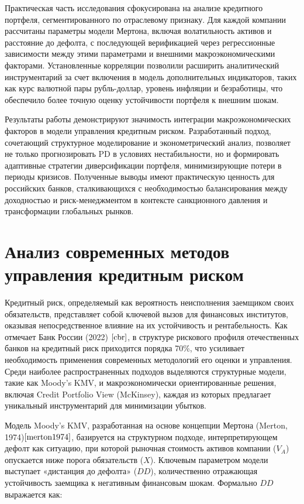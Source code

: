 \documentclass[]{article}
\begin{document}
	Практическая часть исследования сфокусирована на анализе кредитного портфеля, сегментированного по отраслевому признаку. Для каждой компании рассчитаны параметры модели Мертона, включая волатильность активов и расстояние до дефолта, с последующей верификацией через регрессионные зависимости между этими параметрами и внешними макроэкономическими факторами. Установленные корреляции позволили расширить аналитический инструментарий за счет включения в модель дополнительных индикаторов, таких как курс валютной пары рубль-доллар, уровень инфляции и безработицы, что обеспечило более точную оценку устойчивости портфеля к внешним шокам.  
	
	Результаты работы демонстрируют значимость интеграции макроэкономических факторов в модели управления кредитным риском. Разработанный подход, сочетающий структурное моделирование и эконометрический анализ, позволяет не только прогнозировать PD в условиях нестабильности, но и формировать адаптивные стратегии диверсификации портфеля, минимизирующие потери в периоды кризисов. Полученные выводы имеют практическую ценность для российских банков, сталкивающихся с необходимостью балансирования между доходностью и риск-менеджментом в контексте санкционного давления и трансформации глобальных рынков.
	
	
	
	\section{Анализ современных методов управления кредитным риском}
	
	Кредитный риск, определяемый как вероятность неисполнения заемщиком своих обязательств, представляет собой ключевой вызов для финансовых институтов, оказывая непосредственное влияние на их устойчивость и рентабельность. Как отмечает Банк России (2022) $\cite{cbr}$, в структуре рискового профиля отечественных банков на кредитный риск приходится порядка 70\%, что усиливает необходимость применения современных методологий его оценки и управления. Среди наиболее распространенных подходов выделяются структурные модели, такие как Moody’s KMV, и макроэкономически ориентированные решения, включая Credit Portfolio View (McKinsey), каждая из которых предлагает уникальный инструментарий для минимизации убытков.  
	
	Модель Moody’s KMV, разработанная на основе концепции Мертона (Merton, 1974)$\cite{merton1974}$, базируется на структурном подходе, интерпретирующем дефолт как ситуацию, при которой рыночная стоимость активов компании (\(V_A\)) опускается ниже порога обязательств (\(X\)). Ключевым параметром модели выступает «дистанция до дефолта» (\(DD\)), количественно отражающая устойчивость заемщика к негативным финансовым шокам. Формально \(DD\) выражается как:  
	
\end{document}
